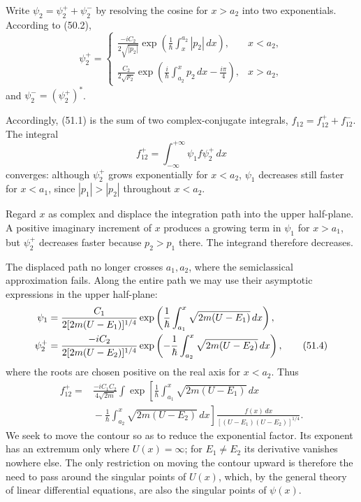 Write $\psi_2=\psi_2^++\psi_2^-$ by resolving the cosine for $x>a_2$ into two
exponentials. According to (50.2),
\begin{equation}
 \psi_2^+=\begin{cases}
 \displaystyle\frac{-iC_2}{2\sqrt{|p_2|}}
 \exp\left(\frac1\hbar\int_x^{a_2}|p_2|\,dx\right),&x<a_2,\\[6pt]
 \displaystyle\frac{C_2}{2\sqrt{p_2}}
 \exp\left(\frac{i}{\hbar}\int_{a_2}^x p_2\,dx-\frac{i\pi}{4}\right),&x>a_2,
 \end{cases} \tag{51.3}
\end{equation}
and $\psi_2^-=(\psi_2^+)^*$.

Accordingly, (51.1) is the sum of two complex-conjugate integrals,
$f_{12}=f_{12}^++f_{12}^-$. The integral
\[
 f_{12}^+=\int_{-\infty}^{+\infty}\psi_1f\psi_2^+\,dx
\]
converges: although $\psi_2^+$ grows exponentially for $x<a_2$, $\psi_1$
decreases still faster for $x<a_1$, since $|p_1|>|p_2|$ throughout $x<a_2$.

Regard $x$ as complex and displace the integration path into the upper
half-plane. A positive imaginary increment of $x$ produces a growing term in
$\psi_1$ for $x>a_1$, but $\psi_2^+$ decreases faster because $p_2>p_1$
there. The integrand therefore decreases.

The displaced path no longer crosses $a_1,a_2$, where the semiclassical
approximation fails. Along the entire path we may use their asymptotic
expressions in the upper half-plane:
\begin{align}
 \psi_1&=\frac{C_1}{2[2m(U-E_1)]^{1/4}}
 \exp\left(\frac1\hbar\int_{a_1}^x\sqrt{2m(U-E_1)}\,dx\right),\notag\\
 \psi_2^+&=\frac{-iC_2}{2[2m(U-E_2)]^{1/4}}
 \exp\left(-\frac1\hbar\int_{a_2}^x\sqrt{2m(U-E_2)}\,dx\right), \tag{51.4}
\end{align}
where the roots are chosen positive on the real axis for $x<a_2$. Thus
\begin{equation}
 \begin{split}
 f_{12}^+={}&\frac{-iC_1C_2}{4\sqrt{2m}}\int
 \exp\left[\frac1\hbar\int_{a_1}^x\sqrt{2m(U-E_1)}\,dx\right.\\
 &\left.{}-\frac1\hbar\int_{a_2}^x\sqrt{2m(U-E_2)}\,dx\right]
 \frac{f(x)\,dx}{[(U-E_1)(U-E_2)]^{1/4}}.
 \end{split}\tag{51.5}
\end{equation}
We seek to move the contour so as to reduce the exponential factor. Its
exponent has an extremum only where $U(x)=\infty$; for $E_1\ne E_2$ its
derivative vanishes nowhere else. The only restriction on moving the contour
upward is therefore the need to pass around the singular points of $U(x)$,
which, by the general theory of linear differential equations, are also the
singular points of $\psi(x)$.

